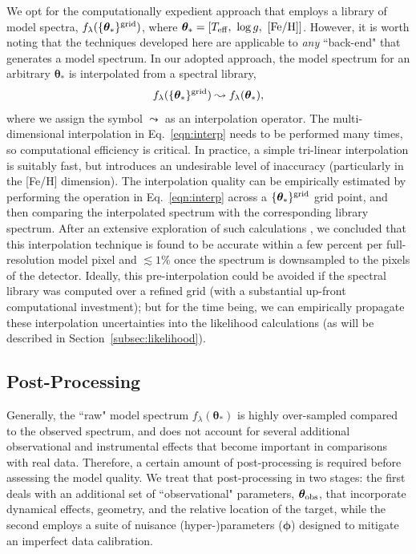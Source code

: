 \documentclass[iop,floatfix]{emulateapj}
\newcommand{\flam}{f_\lambda}
\newcommand{\vt}{ {\bm \theta}}
\newcommand{\vp}{ {\bm \phi}}
\begin{document}
We opt for the computationally expedient approach that employs a library of model spectra, 
$\flam(\{\vt_{\ast}\}^{\rm grid})$, where $\vt_{\ast} = [T_{\rm eff}, \,\, \log{g}, \,\, 
[{\rm Fe/H}]]$.  However, it is worth noting that the techniques developed here are applicable to 
{\it any} ``back-end" that generates a model spectrum.  In our adopted approach, the model 
spectrum for an arbitrary $\vt_{\ast}$ is interpolated from a spectral library, 
\begin{equation} \label{eqn:interp}
\flam(\{\vt_{\ast}\}^{\rm grid}) \leadsto \flam(\vt_{\ast}),
\end{equation}
where we assign the symbol $\leadsto$ as an interpolation operator.  The
multi-dimensional interpolation in Eq.~\ref{eqn:interp} needs to be performed
many times, so computational efficiency is critical.  In practice, a simple
tri-linear interpolation is suitably fast, but introduces an undesirable level
of inaccuracy (particularly in the [Fe/H] dimension).  The interpolation
quality can be empirically estimated by performing the operation in
Eq.~\ref{eqn:interp} across a $\{\vt_{\ast}\}^{\rm grid}$ grid point, and then
comparing the interpolated spectrum with the corresponding library spectrum.
After an extensive exploration of such calculations \citep[see
also][]{husser12}, we concluded that this interpolation technique is found to
be accurate within a few percent per full-resolution model pixel and $\lesssim
1$\% once the spectrum is downsampled to the pixels of the detector. Ideally,
this pre-interpolation could be avoided if the spectral library was computed
over a refined grid (with a substantial up-front computational investment); but
for the time being, we can empirically propagate these interpolation
uncertainties into the likelihood calculations (as will be described in
Section~\ref{subsec:likelihood}).  

\subsection{Post-Processing} \label{subsec:postprocess}

Generally, the ``raw" model spectrum $\flam(\vt_{\ast})$ is highly over-sampled compared to the 
observed spectrum, and does not account for several additional observational and 
instrumental effects that become important in comparisons with real data.  Therefore, a certain 
amount of post-processing is required before assessing the model quality.  We treat that 
post-processing in two stages: the first deals with an additional set of ``observational" 
parameters, $\vt_{\rm obs}$, that incorporate dynamical effects, geometry, and the relative 
location of the target, while the second employs a suite of nuisance (hyper-)parameters ($\vp$) 
designed to mitigate an imperfect data calibration.
\end{document}
